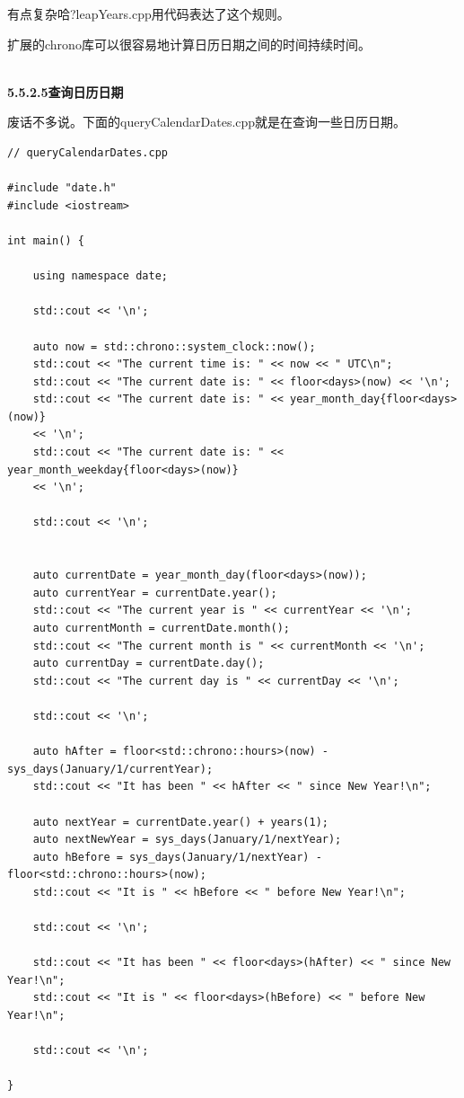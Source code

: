 有点复杂哈?leapYears.cpp用代码表达了这个规则。

扩展的chrono库可以很容易地计算日历日期之间的时间持续时间。

\hspace*{\fill} \\ %
\noindent
\textbf{5.5.2.5\hspace{0.2cm}查询日历日期}

废话不多说。下面的queryCalendarDates.cpp就是在查询一些日历日期。

\begin{lstlisting}[style=styleCXX]
// queryCalendarDates.cpp

#include "date.h"
#include <iostream>

int main() {
	
	using namespace date;
	
	std::cout << '\n';
	
	auto now = std::chrono::system_clock::now();
	std::cout << "The current time is: " << now << " UTC\n";
	std::cout << "The current date is: " << floor<days>(now) << '\n';
	std::cout << "The current date is: " << year_month_day{floor<days>(now)}
	<< '\n';
	std::cout << "The current date is: " << year_month_weekday{floor<days>(now)}
	<< '\n';
	
	std::cout << '\n';
	
	
	auto currentDate = year_month_day(floor<days>(now));
	auto currentYear = currentDate.year();
	std::cout << "The current year is " << currentYear << '\n';
	auto currentMonth = currentDate.month();
	std::cout << "The current month is " << currentMonth << '\n';
	auto currentDay = currentDate.day();
	std::cout << "The current day is " << currentDay << '\n';
	
	std::cout << '\n';
	
	auto hAfter = floor<std::chrono::hours>(now) - sys_days(January/1/currentYear);
	std::cout << "It has been " << hAfter << " since New Year!\n";
	
	auto nextYear = currentDate.year() + years(1);
	auto nextNewYear = sys_days(January/1/nextYear);
	auto hBefore = sys_days(January/1/nextYear) - floor<std::chrono::hours>(now);
	std::cout << "It is " << hBefore << " before New Year!\n";
	
	std::cout << '\n';
	
	std::cout << "It has been " << floor<days>(hAfter) << " since New Year!\n";
	std::cout << "It is " << floor<days>(hBefore) << " before New Year!\n";
	
	std::cout << '\n';
	
}
\end{lstlisting}

